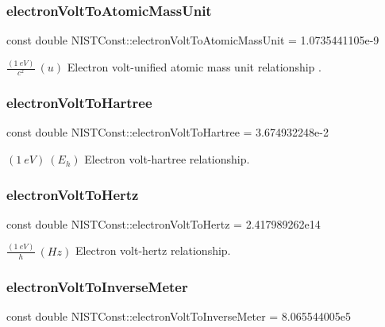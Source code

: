 \subsubsection{\texorpdfstring{electron\+Volt\+To\+Atomic\+Mass\+Unit}{electronVoltToAtomicMassUnit}}
{\footnotesize\ttfamily const double N\+I\+S\+T\+Const\+::electron\+Volt\+To\+Atomic\+Mass\+Unit = 1.\+0735441105e-\/9}

$\frac{(1\ eV)}{c^2}\ (u)$ Electron volt-\/unified atomic mass unit relationship . \mbox{\label{group___electron_volt_gab05ba497cc5a6bd566356469e9de003a}} 
\subsubsection{\texorpdfstring{electron\+Volt\+To\+Hartree}{electronVoltToHartree}}
{\footnotesize\ttfamily const double N\+I\+S\+T\+Const\+::electron\+Volt\+To\+Hartree = 3.\+674932248e-\/2}

$(1\ eV) \ (E_h)$ Electron volt-\/hartree relationship. \mbox{\label{group___electron_volt_gae80c1242d33bf681a09a87d20cd4162e}} 
\subsubsection{\texorpdfstring{electron\+Volt\+To\+Hertz}{electronVoltToHertz}}
{\footnotesize\ttfamily const double N\+I\+S\+T\+Const\+::electron\+Volt\+To\+Hertz = 2.\+417989262e14}

$\frac{(1\ eV)}{h} \ (Hz)$ Electron volt-\/hertz relationship. \mbox{\label{group___electron_volt_ga4c109b95727a76ae489a8dec36a88b65}} 
\subsubsection{\texorpdfstring{electron\+Volt\+To\+Inverse\+Meter}{electronVoltToInverseMeter}}
{\footnotesize\ttfamily const double N\+I\+S\+T\+Const\+::electron\+Volt\+To\+Inverse\+Meter = 8.\+065544005e5}

